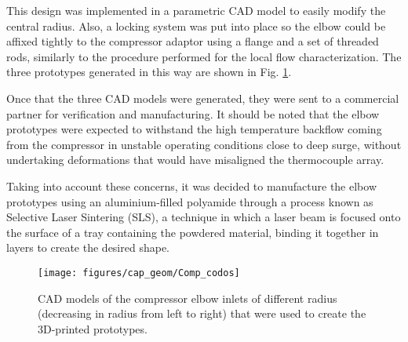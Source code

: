 This design was implemented in a parametric CAD model to easily modify the central radius. Also, a locking system was put into place so the elbow could be affixed tightly to the compressor adaptor using a flange and a set of threaded rods, similarly to the procedure performed for the local flow characterization. The three prototypes generated in this way are shown in Fig. \ref{fig:Comp_codos}.

Once that the three CAD models were generated, they were sent to a commercial partner for verification and manufacturing. It should be noted that the elbow prototypes were expected to withstand the high temperature backflow coming from the compressor in unstable operating conditions close to deep surge, without undertaking deformations that would have misaligned the thermocouple array.

Taking into account these concerns, it was decided to manufacture the elbow prototypes using an aluminium-filled polyamide through a process known as Selective Laser Sintering (SLS), a technique in which a laser beam is focused onto the surface of a tray containing the powdered material, binding it together in layers to create the desired shape. 

\begin{figure}[t!]
\centering
\texttt{[image: figures/cap\_geom/Comp\_codos]}
\caption[CAD models of the compressor elbow inlets]{CAD models of the compressor elbow inlets of different radius (decreasing in radius from left to right) that were used to create the 3D-printed prototypes.}
\label{fig:Comp_codos}
\end{figure}

